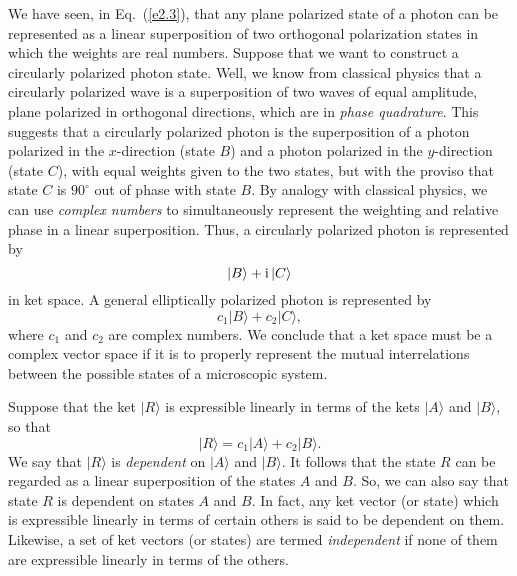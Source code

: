 We have seen, in Eq.~(\ref{e2.3}),
 that any plane polarized state of a photon can be represented
as a linear superposition of two orthogonal polarization states
in which the weights are real numbers. Suppose that
we want to construct a circularly polarized photon state. Well, we know from
classical physics that a circularly polarized wave is a superposition of two
waves of equal amplitude, plane polarized in orthogonal directions, 
which are in {\em phase quadrature}. This suggests that a circularly polarized photon
is the superposition of a photon polarized in the $x$-direction (state $B$)
and a photon polarized in the $y$-direction (state $C$), with equal weights given
to the two states, but with the proviso that state $C$ is $90^\circ$ out of phase
with state $B$. By analogy with classical physics, we can use {\em complex numbers}
to simultaneously represent the  weighting and relative phase in a
linear superposition. Thus, a circularly polarized photon is represented by
\begin{equation}
|B\rangle + {\rm i}\, |C\rangle
\end{equation}
in ket space. A general elliptically polarized photon is represented by
\begin{equation}
c_1 |B\rangle + c_2 |C\rangle,
\end{equation}
where $c_1$ and $c_2$ are  complex numbers. We conclude that
a ket space
must be a complex vector space if it is to properly 
represent the mutual interrelations
between the possible states of a microscopic system. 

Suppose that the ket $|R\rangle$ is expressible linearly in terms of the kets
$|A\rangle$ and $|B\rangle$, so that
\begin{equation}
|R\rangle = c_1 |A\rangle + c_2 |B\rangle.
\end{equation}
We say that $|R\rangle$ is {\em dependent} on $|A\rangle$ and $|B\rangle$. It follows that
the state $R$ can be regarded as a linear superposition of 
the states $A$ and $B$.
So, we can also say that state $R$ is dependent on states $A$ and $B$. 
In fact, any ket vector (or state) which is expressible linearly in
terms of certain others is said to be dependent on them. Likewise, a
set of ket vectors (or states) are termed {\em independent} if none of
them are expressible linearly in terms of the others.


